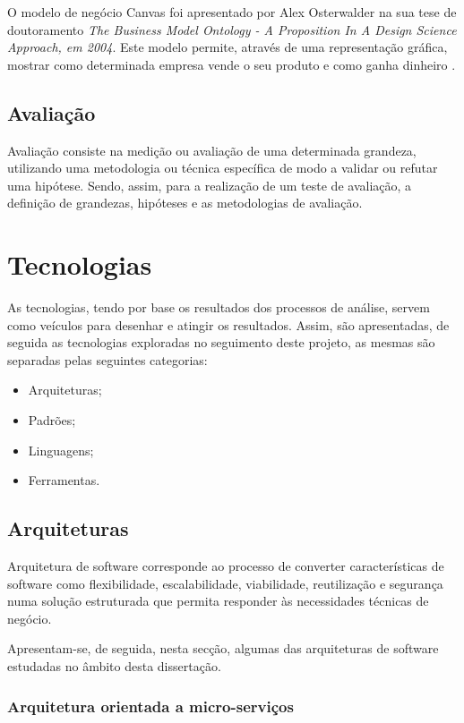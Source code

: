 O modelo de negócio Canvas foi apresentado por Alex Osterwalder na sua tese de doutoramento \emph{The Business Model Ontology - A Proposition In A Design Science Approach, em 2004}. Este modelo permite, através de uma representação gráfica, mostrar como determinada empresa vende o seu produto  e como ganha dinheiro \cite{canvas}.

\subsection{Avaliação \label{estado_arte_avaliacao}}
Avaliação consiste na medição ou avaliação de uma determinada grandeza, utilizando uma metodologia ou técnica específica de modo a validar ou refutar uma hipótese. Sendo, assim, para a realização de um teste de avaliação, a definição de grandezas, hipóteses e as metodologias de avaliação\cite{experimentation_principles}.

\section{Tecnologias}
As tecnologias, tendo por base os resultados dos processos de análise, servem como veículos para desenhar e atingir os resultados. Assim, são apresentadas, de seguida as tecnologias exploradas no seguimento deste projeto, as mesmas são separadas pelas seguintes categorias:
\begin{itemize}
    \item Arquiteturas;
    \item Padrões;
    \item Linguagens;
    \item Ferramentas.
\end{itemize}

\subsection{Arquiteturas}
Arquitetura de software corresponde ao processo de converter características de software como flexibilidade, escalabilidade, viabilidade, reutilização e segurança numa solução estruturada que permita responder às necessidades técnicas de negócio\cite{software_architecture}.

Apresentam-se, de seguida, nesta secção, algumas das arquiteturas de software estudadas no âmbito desta dissertação.

\subsubsection{Arquitetura orientada a micro-serviços}


